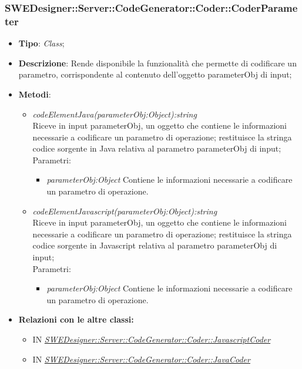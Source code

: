 \documentclass[../DefinizioneDiProdotto.tex]{subfiles}
\begin{document}
			
			
			\subsubsection{SWEDesigner::Server::CodeGenerator::Coder::CoderParameter}
			\hypertarget{SWEDesigner::Server::CodeGenerator::Coder::CoderParameter}{}
			\begin{itemize}
				\item \textbf{Tipo}: \emph{Class};
				\item \textbf{Descrizione}: Rende disponibile la funzionalità che permette di codificare un parametro, corrispondente al contenuto dell'oggetto parameterObj di input;\\
				\item \textbf{Metodi}:
				\begin{itemize}
					\item \emph{codeElementJava(parameterObj:Object):string} \\ 
					Riceve in input parameterObj, un oggetto che contiene le informazioni necessarie a codificare un parametro di operazione; 
					restituisce la stringa codice sorgente in Java relativa al parametro parameterObj di input; \\
					Parametri:
					\begin{itemize}
						\item \emph{parameterObj:Object} Contiene le informazioni necessarie a codificare un parametro di operazione.
					\end{itemize}
					
					
					
					\item \emph{codeElementJavascript(parameterObj:Object):string} \\ 
					Riceve in input parameterObj, un oggetto che contiene le informazioni necessarie a codificare un parametro di operazione; 
					restituisce la stringa codice sorgente in Javascript relativa al parametro parameterObj di input; \\
					Parametri:
					\begin{itemize}
						\item \emph{parameterObj:Object} Contiene le informazioni necessarie a codificare un parametro di operazione.
					\end{itemize}
				\end{itemize}
				
				\item \textbf{Relazioni con le altre classi:}
				\begin{itemize}
					\item IN \hyperlink{SWEDesigner::Server::CodeGenerator::Coder::JavascriptCoder}{\emph{SWEDesigner::Server::CodeGenerator::Coder::JavascriptCoder}}
					\item IN \hyperlink{SWEDesigner::Server::CodeGenerator::Coder::JavaCoder}{\emph{SWEDesigner::Server::CodeGenerator::Coder::JavaCoder}}
				\end{itemize}	
			\end{itemize}
			
\end{document}
